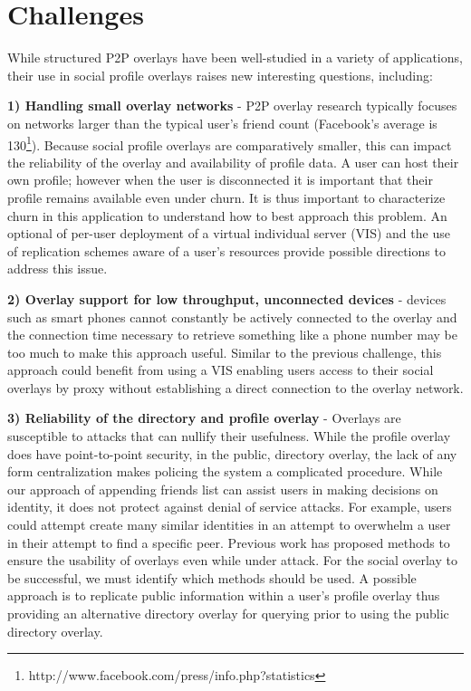 \documentclass[conference]{IEEEtran}
\begin{document}
\section{Challenges}
\label{outstanding}

While structured P2P overlays have been well-studied in a variety of
applications, their use in social profile overlays raises new interesting
questions, including:

{\bf 1) Handling small overlay networks} - P2P overlay research typically
focuses on networks larger than the typical user's friend count (Facebook's
average is 130\footnote{http://www.facebook.com/press/info.php?statistics}).
Because social profile overlays are comparatively smaller, this can impact the
reliability of the overlay and availability of profile data.  A user can host
their own profile; however when the user is disconnected it is important that
their profile remains available even under churn. It is thus important to
characterize churn in this application to understand how to best approach this
problem. An optional of per-user deployment of a virtual individual server
(VIS) and the use of replication schemes aware of a user's resources provide
possible directions to address this issue.

{\bf 2) Overlay support for low throughput, unconnected devices} - devices such
as smart phones cannot constantly be actively connected to the overlay and the
connection time necessary to retrieve something like a phone number may be too
much to make this approach useful.  Similar to the previous challenge, this
approach could benefit from using a VIS enabling users access to their social
overlays by proxy without establishing a direct connection to the overlay
network.

{\bf 3) Reliability of the directory and profile overlay} - Overlays are
susceptible to attacks that can nullify their usefulness.  While the profile
overlay does have point-to-point security, in the public, directory overlay,
the lack of any form centralization makes policing the system a complicated
procedure.  While our approach of appending friends list can assist users in
making decisions on identity, it does not protect against denial of service
attacks.  For example, users could attempt create many similar identities in
an attempt to overwhelm a user in their attempt to find a specific peer.
Previous work has proposed methods to ensure the usability of overlays even
while under attack.  For the social overlay to be successful, we must identify
which methods should be used. A possible approach is to replicate public
information within a user's profile overlay thus providing an alternative
directory overlay for querying prior to using the public directory overlay.
\end{document}
